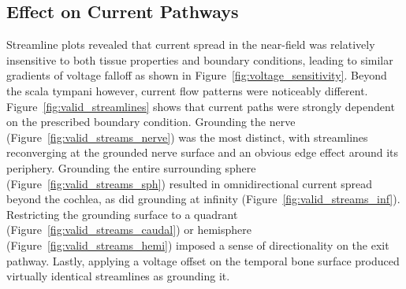 \subsection{Effect on Current Pathways}

Streamline plots revealed that current spread in the near-field was relatively
insensitive to both tissue properties and boundary conditions, leading to
similar gradients of voltage falloff as shown in
Figure~\ref{fig:voltage_sensitivity}. Beyond the scala tympani however, current
flow patterns were noticeably different. Figure~\ref{fig:valid_streamlines}
shows that current paths were strongly dependent on the prescribed boundary
condition. Grounding the nerve (Figure~\ref{fig:valid_streams_nerve}) was the
most distinct, with streamlines reconverging at the grounded nerve surface and
an obvious edge effect around its periphery.  Grounding the entire surrounding
sphere (Figure~\ref{fig:valid_streams_sph}) resulted in omnidirectional current
spread beyond the cochlea, as did grounding at infinity
(Figure~\ref{fig:valid_streams_inf}). Restricting the grounding surface to a
quadrant (Figure~\ref{fig:valid_streams_caudal}) or hemisphere
(Figure~\ref{fig:valid_streams_hemi}) imposed a sense of directionality on the
exit pathway. Lastly, applying a voltage offset on the temporal bone surface
produced virtually identical streamlines as grounding it.

